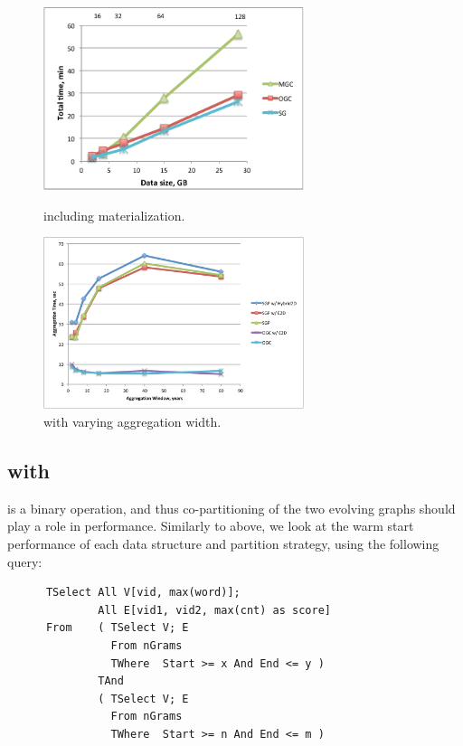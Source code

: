 \begin{figure}
\begin{minipage}{3.3in}
  \centering
  \includegraphics[width=3in]{figs/tgroupe_cold.pdf}
  \caption{ including materialization.}
\label{fig:tgroupe_cold}
\end{minipage}
\begin{minipage}{3.3in}
  \centering
  \includegraphics[width=3in]{figs/tgroupewidth.pdf}
  \caption{ with varying aggregation width.}
  \label{fig:tgroupe_width}
\end{minipage}
\end{figure}

\subsection{ with }

 is a binary operation, and thus co-partitioning of the
two evolving graphs should play a role in performance.  Similarly to
 above, we look at the warm start performance of each
data structure and partition strategy, using the following query:

\begin{small}
\begin{verbatim}
      TSelect All V[vid, max(word)];
              All E[vid1, vid2, max(cnt) as score]
      From    ( TSelect V; E
                From nGrams
                TWhere  Start >= x And End <= y )
              TAnd
              ( TSelect V; E
                From nGrams
                TWhere  Start >= n And End <= m )      
\end{verbatim}
\end{small}

